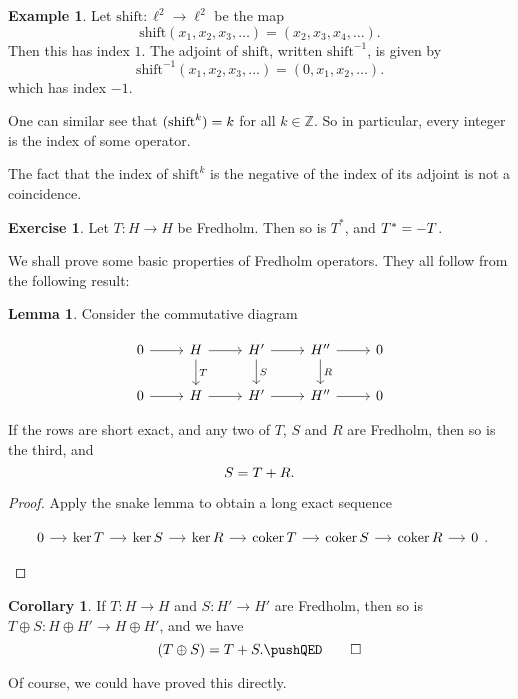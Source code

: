 \documentclass{shortart}
\theoremstyle{definition}
\newtheorem*{eg}{Example}
\newtheorem*{ex}{Exercise}
\newtheorem*{cor}{Corollary}
\newtheorem*{lemma}{Lemma}
\newcommand\Z{\mathbb{Z}}
\let\index\relax %
\DeclareMathOperator{\coker}{coker}
\DeclareMathOperator{\index}{idx}
\begin{document}
\begin{eg}
  Let $\mathrm{shift}: \ell^2 \to \ell^2$ be the map
  \[
    \mathrm{shift}(x_1, x_2, x_3, \dots) = (x_2, x_3, x_4, \dots).
  \]
  Then this has index $1$. The adjoint of $\mathrm{shift}$, written $\mathrm{shift}^{-1}$, is given by
  \[
    \mathrm{shift}^{-1}(x_1, x_2, x_3, \dots) = (0, x_1, x_2, \dots).
  \]
  which has index $-1$.

  One can similar see that $\index (\mathrm{shift}^k) = k$ for all $k \in \Z$. So in particular, every integer is the index of some operator.
\end{eg}

The fact that the index of $\mathrm{shift}^k$ is the negative of the index of its adjoint is not a coincidence.

\begin{ex}
  Let $T: H \to H$ be Fredholm. Then so is $T^*$, and $\index T^* = - \index T$.
\end{ex}

We shall prove some basic properties of Fredholm operators. They all follow from the following result:

\begin{lemma}
  Consider the commutative diagram
  \begin{useimager}
    \[
      \begin{tikzcd}
        0 \ar[r] & H \ar[r] \ar[d, "T"] & H' \ar[r] \ar[d, "S"]& H'' \ar[r] \ar[d, "R"] & 0\\
        0 \ar[r] & H \ar[r] & H' \ar[r] & H'' \ar[r] & 0
      \end{tikzcd}
    \]
  \end{useimager}
  If the rows are short exact, and any two of $T$, $S$ and $R$ are Fredholm, then so is the third, and
  \[
    \index S = \index T + \index R.
  \]
\end{lemma}

\begin{proof}
  Apply the snake lemma to obtain a long exact sequence
  \begin{useimager}
    \[
      \begin{tikzcd}[column sep=small]
        0 \ar[r] & \ker T \ar[r] & \ker S \ar[r] & \ker R \ar[r] & \coker T \ar[r] & \coker S \ar[r] & \coker R \ar[r] & 0
      \end{tikzcd}.\qedhere
    \]
  \end{useimager}
\end{proof}

\begin{cor}
  If $T: H \to H$ and $S: H' \to H'$ are Fredholm, then so is $T \oplus S: H \oplus H' \to H \oplus H'$, and we have
  \[
    \index (T \oplus S) = \index T + \index S.\fakeqed
  \]
\end{cor}
Of course, we could have proved this directly.
\end{document}
